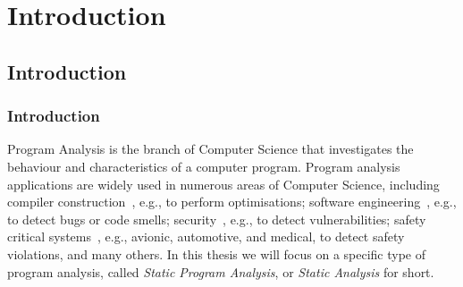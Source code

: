 \part{Introduction}
\chapter{Introduction}
\section{Introduction}

Program Analysis is the branch of Computer Science that investigates the behaviour
and characteristics of a computer program. Program analysis applications are widely
used in numerous areas of Computer Science, including compiler construction~\cite{aho2007compilers,appel2004modern},
e.g., to perform optimisations; software engineering~\cite{ayewah2008using,dura2021javadl,fink2012wala}, e.g., to detect bugs or
code smells; security~\cite{piskachev2021secucheck,flowDroid}, e.g., to detect vulnerabilities; safety
critical systems~\cite{cousot2005astree,Blanchet2002}, e.g., avionic, automotive, and medical, to detect safety
violations, and many others. In this thesis we will focus on a specific type of program analysis, called
\emph{Static Program Analysis}, or \emph{Static Analysis} for short.


